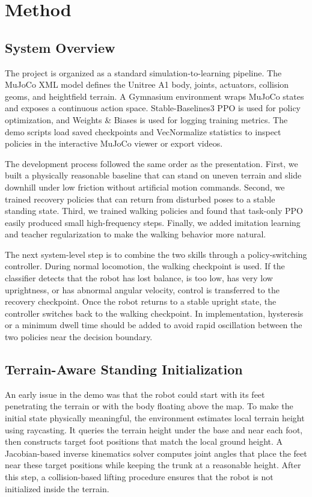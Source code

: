 \documentclass[conference]{IEEEtran}
\begin{document}
\section{Method}
\subsection{System Overview}
The project is organized as a standard simulation-to-learning pipeline. The MuJoCo XML model defines the Unitree A1 body, joints, actuators, collision geoms, and heightfield terrain. A Gymnasium environment wraps MuJoCo states and exposes a continuous action space. Stable-Baselines3 PPO is used for policy optimization, and Weights \& Biases is used for logging training metrics. The demo scripts load saved checkpoints and VecNormalize statistics to inspect policies in the interactive MuJoCo viewer or export videos.

The development process followed the same order as the presentation. First, we built a physically reasonable baseline that can stand on uneven terrain and slide downhill under low friction without artificial motion commands. Second, we trained recovery policies that can return from disturbed poses to a stable standing state. Third, we trained walking policies and found that task-only PPO easily produced small high-frequency steps. Finally, we added imitation learning and teacher regularization to make the walking behavior more natural.

The next system-level step is to combine the two skills through a policy-switching controller. During normal locomotion, the walking checkpoint is used. If the classifier detects that the robot has lost balance, is too low, has very low uprightness, or has abnormal angular velocity, control is transferred to the recovery checkpoint. Once the robot returns to a stable upright state, the controller switches back to the walking checkpoint. In implementation, hysteresis or a minimum dwell time should be added to avoid rapid oscillation between the two policies near the decision boundary.

\subsection{Terrain-Aware Standing Initialization}
An early issue in the demo was that the robot could start with its feet penetrating the terrain or with the body floating above the map. To make the initial state physically meaningful, the environment estimates local terrain height using raycasting. It queries the terrain height under the base and near each foot, then constructs target foot positions that match the local ground height. A Jacobian-based inverse kinematics solver computes joint angles that place the feet near these target positions while keeping the trunk at a reasonable height. After this step, a collision-based lifting procedure ensures that the robot is not initialized inside the terrain.
\end{document}

